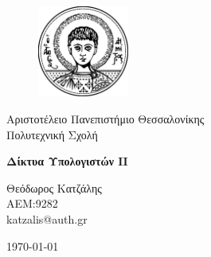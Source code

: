 \begin{titlepage}

\begin{figure}[h!]
  \begin{center}
    \includegraphics[width=3cm]{assets/auth.pdf}
    \label{fig:cover_auth_logo}
  \end{center}
\end{figure}

\centering
\Large Αριστοτέλειο Πανεπιστήμιο Θεσσαλονίκης\\
\Large Πολυτεχνική Σχολή\\

\vspace{\fill}

\LARGE \textbf{Δίκτυα Υπολογιστών ΙΙ}

\vspace{\fill}

\Large Θεόδωρος Κατζάλης \\
\Large ΑΕΜ:9282 \\ 
\Large katzalis@auth.gr

\vspace{\fill}
\raggedright

\centering
\vspace{\fill}
\today

\end{titlepage}
